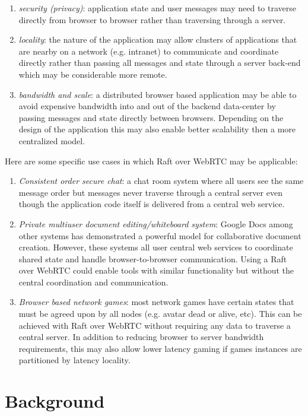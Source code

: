 \documentclass{acmtog} %
\begin{document}
\begin{enumerate}
\item \emph{security (privacy)}: application state and user messages may need to traverse directly from browser to browser rather than traversing through a server.
\item \emph{locality}: the nature of the application may allow clusters of applications that are nearby on a network (e.g. intranet) to communicate and coordinate directly rather than passing all messages and state through a server back-end which may be considerable more remote.
\item \emph{bandwidth and scale}: a distributed browser based application may be able to avoid expensive bandwidth into and out of the backend data-center by passing messages and state directly between browsers.  Depending on the design of the application this may also enable better scalability then a more centralized model.
\end{enumerate}

Here are some specific use cases in which Raft over WebRTC may be
applicable:

\begin{enumerate}
\item \emph{Consistent order secure chat}: a chat room system where all users see the same message order but messages never traverse through a central server even though the application code itself is delivered from a central web service.
\item \emph{Private multiuser document editing/whiteboard system}: Google Docs among other systems has demonstrated a powerful model for collaborative document creation. However, these systems all user central web services to coordinate shared state and handle browser-to-browser communication. Using a Raft over WebRTC could enable tools with similar functionality but without the central coordination and communication.
\item \emph{Browser based network games}: most network games have certain states that must be agreed upon by all nodes (e.g. avatar dead or alive, etc). This can be achieved with Raft over WebRTC without requiring any data to traverse a central server. In addition to reducing browser to server bandwidth requirements, this may also allow lower latency gaming if games instances are partitioned by latency locality.
\end{enumerate}

\section{Background}
\end{document}
